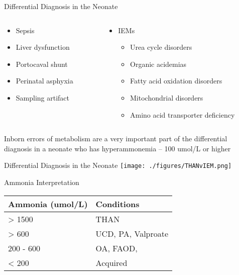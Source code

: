 \documentclass[presentation, smaller]{beamer}
\begin{document}
\begin{frame}[label={sec:orgheadline17}]{Differential Diagnosis in the Neonate}
\begin{columns}
\begin{column}{0.5\columnwidth}
\begin{itemize}
\item Sepsis
\item Liver dysfunction
\item Portocaval shunt
\item Perinatal asphyxia
\item Sampling artifact
\end{itemize}
\end{column}


\begin{column}{0.5\columnwidth}
\begin{itemize}
\item IEMs
\begin{itemize}
\item Urea cycle disorders
\item Organic acidemias
\item Fatty acid oxidation disorders
\item Mitochondrial disorders
\item Amino acid transporter deficiency
\end{itemize}
\end{itemize}
\end{column}
\end{columns}

\begin{block}{}
Inborn errors of metabolism are a very important part of the differential diagnosis in a neonate who has hyperammonemia -- 100 umol/L or higher
\end{block}
\end{frame}

\begin{frame}[label={sec:orgheadline18}]{Differential Diagnosis in the Neonate}
\centering
\texttt{[image: ./figures/THANvIEM.png]}
\end{frame}

\begin{frame}[label={sec:orgheadline19}]{Ammonia Interpretation}
\begin{center}
\begin{tabular}{ll}
Ammonia (umol/L) & Conditions\\
\hline
> 1500 & THAN\\
> 600 & UCD, PA, Valproate\\
200 - 600 & OA, FAOD,\\
< 200 & Acquired\\
\end{tabular}
\end{center}
\end{frame}
\end{document}

